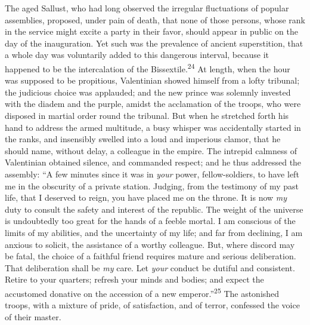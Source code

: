 The aged Sallust, who had long observed the irregular
fluctuations of popular assemblies, proposed, under pain of
death, that none of those persons, whose rank in the service
might excite a party in their favor, should appear in public on
the day of the inauguration. Yet such was the prevalence of
ancient superstition, that a whole day was voluntarily added to
this dangerous interval, because it happened to be the
intercalation of the Bissextile.\textsuperscript{24} At length, when the hour was
supposed to be propitious, Valentinian showed himself from a
lofty tribunal; the judicious choice was applauded; and the new
prince was solemnly invested with the diadem and the purple,
amidst the acclamation of the troops, who were disposed in
martial order round the tribunal. But when he stretched forth his
hand to address the armed multitude, a busy whisper was
accidentally started in the ranks, and insensibly swelled into a
loud and imperious clamor, that he should name, without delay, a
colleague in the empire. The intrepid calmness of Valentinian
obtained silence, and commanded respect; and he thus addressed
the assembly: “A few minutes since it was in \textit{your} power,
fellow-soldiers, to have left me in the obscurity of a private
station. Judging, from the testimony of my past life, that I
deserved to reign, you have placed me on the throne. It is now
\textit{my} duty to consult the safety and interest of the republic. The
weight of the universe is undoubtedly too great for the hands of
a feeble mortal. I am conscious of the limits of my abilities,
and the uncertainty of my life; and far from declining, I am
anxious to solicit, the assistance of a worthy colleague. But,
where discord may be fatal, the choice of a faithful friend
requires mature and serious deliberation. That deliberation shall
be \textit{my} care. Let \textit{your} conduct be dutiful and consistent.
Retire to your quarters; refresh your minds and bodies; and
expect the accustomed donative on the accession of a new
emperor.”\textsuperscript{25} The astonished troops, with a mixture of pride, of
satisfaction, and of terror, confessed the voice of their master.


